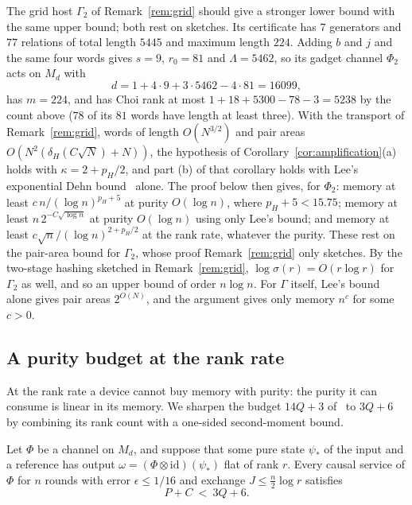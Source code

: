 \begin{remark}\label{rem:grid-channel}
The grid host $\Gamma_2$ of Remark~\ref{rem:grid} should give a stronger lower bound with the same upper bound; both rest on sketches. Its certificate has $7$ generators and $77$
relations of total length $5445$ and maximum length $224$. Adding $b$ and $j$ and the same four words gives $s=9$, $r_0=81$ and $\Lambda=5462$, so
its gadget channel $\Phi_2$ acts on $M_d$ with
\[
d=1+4\cdot9+3\cdot5462-4\cdot81=16099,
\]
has $m=224$, and has Choi rank at most $1+18+5300-78-3=5238$ by the count above ($78$ of its $81$ words have length at least three). With the
transport of Remark~\ref{rem:grid}, words of length $O(N^{3/2})$ and pair areas $O(N^2(\delta_H(C\sqrt N)+N))$, the hypothesis of
Corollary~\ref{cor:amplification}(a) holds with $\kappa=2+p_H/2$, and part (b) of that corollary holds with Lee's exponential Dehn
bound~\cite{Lee2012} alone. The proof below then gives, for $\Phi_2$: memory at least $c\,n/(\log n)^{p_H+5}$ at purity $O(\log n)$, where
$p_H+5<15.75$; memory at least $n\,2^{-C\sqrt{\log n}}$ at purity $O(\log n)$ using only Lee's bound; and memory at least
$c\sqrt n/(\log n)^{2+p_H/2}$ at the rank rate, whatever the purity. These rest on the pair-area bound for $\Gamma_2$, whose proof
Remark~\ref{rem:grid} only sketches. By the two-stage hashing sketched in Remark~\ref{rem:grid}, $\log\sigma(r)=O(r\log r)$ for $\Gamma_2$ as well, and so an upper bound of order
$n\log n$. For $\Gamma$ itself, Lee's bound alone gives pair areas $2^{O(N)}$, and the argument gives only memory $n^{c}$ for some $c>0$.
\end{remark}

\subsection{A purity budget at the rank rate}\label{sec:purity-budget}

At the rank rate a device cannot buy memory with purity: the purity it can consume is linear in its memory. We sharpen the budget $14Q+3$
of~\cite{DouglasMghirbiB} to $3Q+6$ by combining its rank count with a one-sided second-moment bound.

\begin{proposition}\label{prop:purity-budget}
Let $\Phi$ be a channel on $M_d$, and suppose that some pure state $\psi_*$ of the input and a reference has output
$\omega=(\Phi\otimes\mathrm{id})(\psi_*)$ flat of rank $r$. Every causal service of $\Phi$ for $n$ rounds with error $\epsilon\le1/16$ and exchange
$J\le\frac n2\log r$ satisfies
\[
P+C\ <\ 3Q+6 .
\]
\end{proposition}

